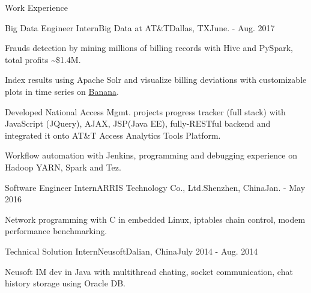 \documentclass{resume} %
\begin{document}



\begin{rSection}{Work Experience}
\begin{rSubsection}{Big Data Engineer Intern}{Big Data at AT\&T}{Dallas, TX}{June. - Aug. 2017}
\item Frauds detection by mining millions of billing records with Hive and PySpark, total profits \textasciitilde \$1.4M.
\item Index results using Apache Solr and visualize billing deviations with customizable plots in time series on \href{https://github.com/lucidworks/banana}{Banana}.
\item Developed National Access Mgmt. projects progress tracker (full stack) with JavaScript (JQuery), AJAX, JSP(Java EE), fully-RESTful backend and integrated it onto AT\&T Access Analytics Tools Platform.
\item Workflow automation with Jenkins, programming and debugging experience on Hadoop YARN, Spark and Tez.
\end{rSubsection}

\begin{rSubsection}{Software Engineer Intern}{ARRIS Technology Co., Ltd.}{Shenzhen, China}{Jan. - May 2016}
\item Network programming with C in embedded Linux, iptables chain control, modem performance benchmarking.
\end{rSubsection}

\begin{rSubsection}{Technical Solution Intern}{Neusoft}{Dalian, China}{July 2014 - Aug. 2014}
\item Neusoft IM dev in Java with multithread chating, socket communication, chat history storage using Oracle DB.
\end{rSubsection}
\end{rSection}
\end{document}
